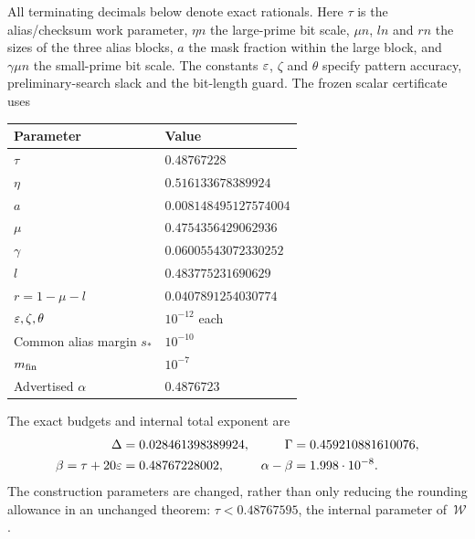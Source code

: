 All terminating decimals below denote exact rationals. Here $\tau$ is the alias/checksum work parameter, $\eta n$ the large-prime bit scale, $\mu n$, $ln$ and $rn$ the sizes of the three alias blocks, $a$ the mask fraction within the large block, and $\gamma\mu n$ the small-prime bit scale. The constants $\varepsilon$, $\zeta$ and $\theta$ specify pattern accuracy, preliminary-search slack and the bit-length guard. The frozen scalar certificate uses
\begin{center}\small
\begin{tabular}{@{}ll@{}}\toprule
Parameter & Value\\\midrule
$\tau$ & $0.48767228$\\
$\eta$ & $0.516133678389924$\\
$a$ & $0.008148495127574004$\\
$\mu$ & $0.4754356429062936$\\
$\gamma$ & $0.06005543072330252$\\
$l$ & $0.483775231690629$\\
$r=1-\mu-l$ & $0.0407891254030774$\\
$\varepsilon,\zeta,\theta$ & $10^{-12}$ each\\
Common alias margin $s_*$ & $10^{-10}$\\
$m_{\rm fin}$ & $10^{-7}$\\
Advertised $\alpha$ & $0.4876723$\\\bottomrule
\end{tabular}
\end{center}
The exact budgets and internal total exponent are
\begin{align*}
 \Delta&=0.028461398389924,&\Gamma&=0.459210881610076,\\
 \beta=\tau+20\varepsilon&=0.48767228002,&\alpha-\beta&=1.998\cdot10^{-8}.
\end{align*}
The construction parameters are changed, rather than only reducing the
rounding allowance in an unchanged theorem: $\tau<0.48767595$, the
internal parameter of~$\mathcal W$.


